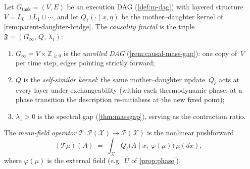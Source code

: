 \begin{definition}\label{def:causality-fractal}
Let $G_{\mathrm{task}} = (V, E)$ be an execution DAG
(\cref{def:m-dag}) with layered structure
$V = L_0 \sqcup L_1 \sqcup \cdots$, and let
$Q_\ell(\cdot \mid x, \eta)$ be the mother--daughter kernel
of \cref{rem:parent-daughter-bridge}.  The
\emph{causality fractal} is the triple
$\mathfrak{F} = (G_\infty,\, Q,\, \lambda_1)$:
\begin{enumerate}[label=(\roman*),nosep]
  \item $G_\infty = V \times \mathbb{Z}_{\ge 0}$ is the
  \emph{unrolled DAG} (\cref{rem:causal-mass-gap}): one copy
  of~$V$ per time step, edges pointing strictly forward;
  \item $Q$ is the \emph{self-similar kernel}: the same
  mother--daughter update~$Q_\ell$ acts at every layer under
  exchangeability (within each thermodynamic phase;
  at a phase transition the description re-initialises
  at the new fixed point);
  \item $\lambda_1 > 0$ is the spectral gap
  (\cref{thm:massgap}), serving as the contraction ratio.
\end{enumerate}
The \emph{mean-field operator}
$\mathcal{T} \colon \mathcal{P}(\mathcal{X}) \to
\mathcal{P}(\mathcal{X})$ is the nonlinear pushforward
\begin{equation}\label{eq:mf-operator}
  (\mathcal{T}\mu)(A)
  \;=\;
  \int_{\mathcal{X}}
  Q_\ell\!\bigl(A \mid x,\;\varphi(\mu)\bigr)\,\mu(dx),
\end{equation}
where $\varphi(\mu)$ is the external field
(e.g.\ $\bar{U}$ of \cref{prop:phase}).
\end{definition}

